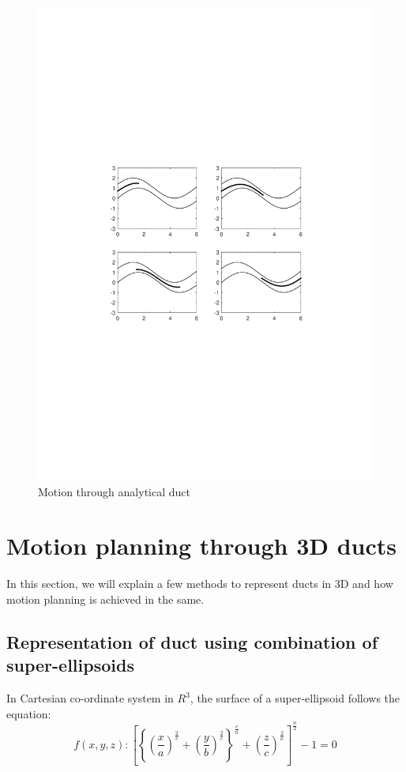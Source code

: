 \documentclass[12pt,a4]{article}
\begin{document}
\begin{figure}[h]
\centering
\includegraphics[scale=0.75]{figures/fig12.pdf}
\caption{ Motion through analytical duct \label{fig:analyticductmotion}}
\end{figure}


\section{Motion planning through 3D ducts}
In this section, we will explain a few methods to represent ducts in 3D and how motion planning is achieved in the same.
\subsection{Representation of duct using combination of super-ellipsoids}
In Cartesian co-ordinate system in $R^3$, the surface of a super-ellipsoid follows the equation:
\begin{equation}
f(x,y,z) : \left[ \left\lbrace \left(\frac{x}{a} \right)^{\frac 2e} +\left(\frac{y}{b} \right)^{\frac 2e} \right\rbrace^{\frac{e}{n}} +\left(\frac{z}{c} \right)^{\frac 2n}  \right]^\frac n2-1 =0
\end{equation}
\end{document}
